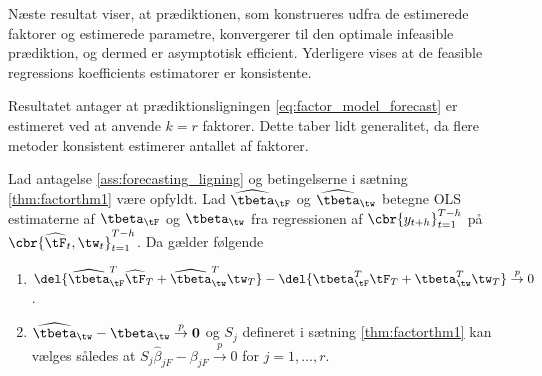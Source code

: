 \newpage

Næste resultat viser, at prædiktionen, som konstrueres udfra de estimerede faktorer og estimerede parametre, konvergerer til den optimale infeasible prædiktion, og dermed er asymptotisk efficient.
Yderligere vises at de feasible regressions koefficients estimatorer er konsistente.

Resultatet antager at prædiktionsligningen \eqref{eq:factor_model_forecast} er estimeret ved at anvende \(k=r\) faktorer.
Dette taber lidt generalitet, da flere metoder konsistent estimerer antallet af faktorer.

\begin{thm} \label{thm:factorthm2}
Lad antagelse \ref{ass:forecasting_ligning} og betingelserne i sætning \ref{thm:factorthm1} være opfyldt. 
Lad \(\widehat{\tbeta}_{\tF}\) og \(\widehat{\tbeta}_{\tw}\) betegne OLS estimaterne af \(\tbeta_{\tF}\) og \(\tbeta_{\tw}\) fra regressionen af \(\cbr{y_{t+h}}_{t=1}^{T-h}\) på \(\cbr{\widehat{\tF}_t, \tw_t}_{t=1}^{T-h}\). Da gælder følgende
\begin{enumerate}
\item \(\del{\widehat{\tbeta}_{\tF}^T \widehat{\tF}_T + \widehat{\tbeta}^T_{\tw} \tw_T} - \del{\tbeta_{\tF}^T \tF_T + \tbeta_{\tw}^T \tw_T} \overset{p}{\rightarrow} 0\).
\item \(\widehat{\tbeta}_{\tw} - \tbeta_{\tw} \overset{p}{\rightarrow} \mathbf{0}\) og \(S_j\) defineret i sætning \ref{thm:factorthm1} kan vælges således at \(S_j \widehat{\beta}_{jF} - \beta_{jF} \overset{p}{\rightarrow} 0\) for \(j = 1, \ldots, r\).
\end{enumerate}
\end{thm}
%
